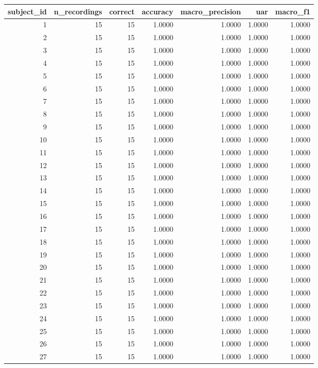 \begin{tabular}{rrrrrrr}
\toprule
subject_id & n_recordings & correct & accuracy & macro_precision & uar & macro_f1 \\
\midrule
1 & 15 & 15 & 1.0000 & 1.0000 & 1.0000 & 1.0000 \\
2 & 15 & 15 & 1.0000 & 1.0000 & 1.0000 & 1.0000 \\
3 & 15 & 15 & 1.0000 & 1.0000 & 1.0000 & 1.0000 \\
4 & 15 & 15 & 1.0000 & 1.0000 & 1.0000 & 1.0000 \\
5 & 15 & 15 & 1.0000 & 1.0000 & 1.0000 & 1.0000 \\
6 & 15 & 15 & 1.0000 & 1.0000 & 1.0000 & 1.0000 \\
7 & 15 & 15 & 1.0000 & 1.0000 & 1.0000 & 1.0000 \\
8 & 15 & 15 & 1.0000 & 1.0000 & 1.0000 & 1.0000 \\
9 & 15 & 15 & 1.0000 & 1.0000 & 1.0000 & 1.0000 \\
10 & 15 & 15 & 1.0000 & 1.0000 & 1.0000 & 1.0000 \\
11 & 15 & 15 & 1.0000 & 1.0000 & 1.0000 & 1.0000 \\
12 & 15 & 15 & 1.0000 & 1.0000 & 1.0000 & 1.0000 \\
13 & 15 & 15 & 1.0000 & 1.0000 & 1.0000 & 1.0000 \\
14 & 15 & 15 & 1.0000 & 1.0000 & 1.0000 & 1.0000 \\
15 & 15 & 15 & 1.0000 & 1.0000 & 1.0000 & 1.0000 \\
16 & 15 & 15 & 1.0000 & 1.0000 & 1.0000 & 1.0000 \\
17 & 15 & 15 & 1.0000 & 1.0000 & 1.0000 & 1.0000 \\
18 & 15 & 15 & 1.0000 & 1.0000 & 1.0000 & 1.0000 \\
19 & 15 & 15 & 1.0000 & 1.0000 & 1.0000 & 1.0000 \\
20 & 15 & 15 & 1.0000 & 1.0000 & 1.0000 & 1.0000 \\
21 & 15 & 15 & 1.0000 & 1.0000 & 1.0000 & 1.0000 \\
22 & 15 & 15 & 1.0000 & 1.0000 & 1.0000 & 1.0000 \\
23 & 15 & 15 & 1.0000 & 1.0000 & 1.0000 & 1.0000 \\
24 & 15 & 15 & 1.0000 & 1.0000 & 1.0000 & 1.0000 \\
25 & 15 & 15 & 1.0000 & 1.0000 & 1.0000 & 1.0000 \\
26 & 15 & 15 & 1.0000 & 1.0000 & 1.0000 & 1.0000 \\
27 & 15 & 15 & 1.0000 & 1.0000 & 1.0000 & 1.0000 \\

\end{tabular}
